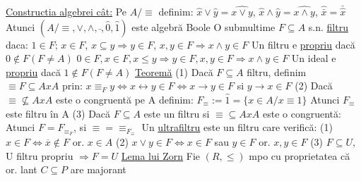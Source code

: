 \documentclass[8pt,twocolumn]{extarticle}
\begin{document}
	\noindent \underline{Constructia algebrei cât:} \newline
	Pe $A/\equiv$ definim: \newline
	$\hat{x} \vee \hat{y} = \widehat{x \vee y}$, $\hat{x} \wedge \hat{y} = \widehat{x \wedge y}$, $\hat{\bar{x}} = \bar{\hat{x}}$ \newline
	Atunci $(A/\equiv, \vee, \wedge, \bar{ }, \hat{0}, \hat{1})$ este algebră Boole \newline
	O submultime $F \subseteq A$ s.n. \underline {filtru} daca: \newline
	$1 \in F$; $x \in F$, $x \subseteq y \Rightarrow y \in F$, $x, y \in F \Rightarrow x \wedge y \in F$ \newline
	Un filtru e \underline{propriu} dacă $0 \notin F (F \neq A)$ \newline
	$0 \in F, x \in F, x \leq y \Rightarrow y \in F, x, y \in F \Rightarrow x \wedge y \in F$ \newline
	Un ideal e \underline{propriu} dacă $1 \notin F(F \neq A)$ \newline
	\underline{Teoremă} \newline
	(1) Dacă $F \subseteq A$ filtru, definim $\equiv F \subseteq A x A$ prin: \newline
	$x \equiv _{F} y \Leftrightarrow x \leftrightarrow y \in F \Leftrightarrow x \rightarrow y \in F$ si $y \rightarrow x \in F$ \newline
	(2) Dacă $\equiv \not\subseteq A x A$ este o congruentă pe A definim: \newline
	$F_{\equiv} := \hat{1} = \{x \in A / x \equiv 1\}$ \newline
	Atunci $F_{\equiv}$ este filtru în A \newline
	(3) Dacă $F \subseteq A$ este un filtru si $\equiv \subseteq A x A$ este o congruentă: \newline
	Atunci $F = F_{\equiv _{F}}$, si $\equiv = \equiv _{F_{\equiv}}$ \newline
	Un \underline{ultrafiltru} este un filtru care verifică: \newline
	(1) $x \in F \Leftrightarrow \overline{x} \notin F$ or. $x \in A$ \newline
	(2) $x \vee y \in F \Leftrightarrow x \in F$ sau $y \in F$ or. $x, y \in F$ \newline
	(3) $F \subseteq U$, U filtru propriu $\Rightarrow F = U$ \newline
	\underline{Lema lui Zorn} \newline
	Fie $(R, \leq)$ mpo cu proprietatea că or. lant $C \subseteq P$ are majorant \newline
\end{document}

